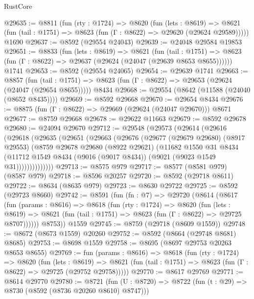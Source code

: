 \begin{lexlean}{RustCore}
\begin{coremodule}
@29635 := @8811
    (fun (rty : @1724) =>
    @8620
      (fun (lets : @8619) =>
      @8621 (fun (tail : @1751) => @8623 (fun (Γ : @8622) => @29620 (@29624 @29589)))))
    @1690
@29637 := @8592 (@29554 @24043)
@29639 := @24048 @29584 @19853
@29651 := @8833
    (fun (lets : @8619) =>
    @8621
      (fun (tail : @1751) =>
      @8623 (fun (Γ : @8622) => @29637 (@29624 (@24047 (@29639 @8653 @8655))))))
    @1741
@29653 := @8592 (@29554 @24065)
@29654 := @29639 @1741
@29663 := @8857
    (fun (tail : @1751) => @8623 (fun (Γ : @8622) => @29653 (@29624 (@24047 (@29654 @8655)))))
    @8434
@29668 := @29554 (@8642 (@11588 (@24040 (@8652 @8435))))
@29669 := @8592 @29668
@29670 := @29654 @8434
@29676 := @8875 (fun (Γ : @8622) => @29669 (@29624 (@24047 @29670))) @8671
@29677 := @8759 @29668
@29678 := @29622 @11663
@29679 := @8592 @29678
@29680 := @24094 @29670
@29712 := @29548
    (@29573
      (@29614
        (@29616
          (@29618
            (@29635
              (@29651
                (@29663
                  (@29676
                    (@29677
                      (@29679 @29680)
                      (@8917 @29553)
                      (@8759
                        @29678
                        @29680
                        (@8922 @29621)
                        (@11682
                          @1550
                          @31
                          @8434
                          (@11712
                            @1549
                            @8434
                            (@9016 (@9017 @8434))
                            (@9021 (@9023 @1549 @31))))))))))))))
@29713 := @8575 @979
@29717 := @8577 (@8581 @979) (@8587 @979)
@29718 := @8596 @20257
@29720 := @8592 (@29718 @8611)
@29722 := @8634 (@8635 @979)
@29723 := @8630 @29722
@29725 := @8592 (@29723 @8660)
@29742 := @8591
    (fun (fn : @7) =>
    @29720
      (@8614
        (@8617
          (fun (params : @8616) =>
          @8618
            (fun (rty : @1724) =>
            @8620
              (fun (lets : @8619) =>
              @8621 (fun (tail : @1751) => @8623 (fun (Γ : @8622) => @29725 @8707))))))
        @8753))
    @1559
@29745 := @8759 (@29718 (@8609 @1559))
@29748 := @8672 (@8673 @1559) @20260
@29752 := @8592 (@8664 (@29748 @8681) @8685)
@29753 := @8698 @1559
@29758 := @8695 (@8697 @29753 @20263 @8653 @8655)
@29769 := fun (params : @8616) =>
  @8618
    (fun (rty : @1724) =>
    @8620
      (fun (lets : @8619) =>
      @8621 (fun (tail : @1751) => @8623 (fun (Γ : @8622) => @29725 (@29752 @29758)))))
@29770 := @8617 @29769
@29771 := @8614 @29770
@29780 := @8721
    (fun (U : @8720) => @8722 (fun (t : @29) => @8730 (@8592 (@8736 @20260 @8610) @8747)))

\end{coremodule}
\end{lexlean}

